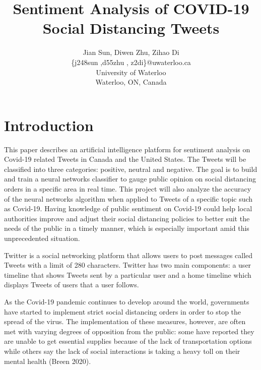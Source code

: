 \documentclass[letterpaper]{article} %
\begin{document}
%
\title{Sentiment Analysis of COVID-19 Social Distancing Tweets}
\author{Jian Sun, Diwen Zhu, Zihao Di\\
\{j248sun ,d55zhu , z2di\}@uwaterloo.ca\\
University of Waterloo\\
Waterloo, ON, Canada\\
}
\maketitle



\section{Introduction}

This paper describes an artificial intelligence platform for sentiment analysis on Covid-19 related Tweets in Canada and the United States. The Tweets will be classified into three categories: positive, neutral and negative. The goal is to build and train a neural networks classifier to gauge public opinion on social distancing orders in a specific area in real time. This project will also analyze the accuracy of the neural networks algorithm when applied to Tweets of a specific topic such as Covid-19. Having knowledge of public sentiment on Covid-19 could help local authorities improve and adjust their social distancing policies to better suit the needs of the public in a timely manner, which is especially important amid this unprecedented situation.

Twitter is a social networking platform that allows users to post messages called Tweets with a limit of 280 characters. Twitter has two main components: a user timeline that shows Tweets sent by a particular user and a home timeline which displays Tweets of users that a user follows.

As the Covid-19 pandemic continues to develop around the world, governments have started to implement strict social distancing orders in order to stop the spread of the virus. The implementation of these measures, however, are often met with varying degrees of opposition from the public: some have reported they are unable to get essential supplies because of the lack of transportation options while others say the lack of social interactions is taking a heavy toll on their mental health (Breen 2020).
\end{document}
